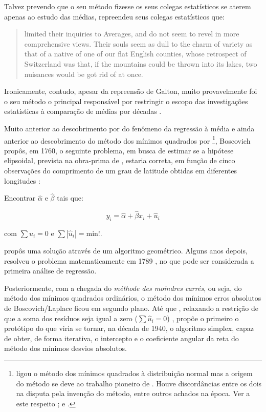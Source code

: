 \documentclass[a4paper, 12pt]{article}
\let\rmarkdownfootnote\footnote%
\def\footnote{\protect\rmarkdownfootnote}
\begin{document}
Talvez prevendo que o seu método fizesse os seus colegas estatísticos se
aterem apenas ao estudo das médias, \textcite[p.~62]{galton}
\autocite[\emph{apud}][p.~350]{koenker2000} repreendeu seus colegas
estatísticos que:

\begin{quote}
limited their inquiries to Averages, and do not seem to revel in more
comprehensive views. Their souls seem as dull to the charm of variety as
that of a native of one of our flat English counties, whose retrospect
of Switzerland was that, if the mountains could be thrown into its
lakes, two nuisances would be got rid of at once.
\end{quote}

Ironicamente, contudo, apesar da repreensão de Galton, muito
provavelmente foi o seu método o principal responsável por restringir o
escopo das investigações estatísticas à comparação de médias por décadas
\autocite[350]{koenker2000}.

Muito anterior ao descobrimento por \textcite{galton} do fenômeno da
regressão à média e ainda anterior ao descobrimento do método dos
mínimos quadrados por \textcite{legendre1805} \footnote{\textcite{gauss1809}
  ligou o método dos mínimos quadrados à distribuição normal mas a
  origem do método se deve ao trabalho pioneiro de
  \textcite{legendre1805}. Houve discordâncias entre os dois na disputa
  pela invenção do método, entre outros achados na época. Ver a este
  respeito \textcite{STIGLER197731}; \textcite{stigler1981} e
  \textcite{stigler1986}.}, Boscovich propôs, em 1760, o seguinte
problema, em busca de estimar se a hipótese elipsoidal, prevista na
obra-prima de \textcite{newton}, estaria correta, em função de cinco
observações do comprimento de um grau de latitude obtidas em diferentes
longitudes
\autocites[p.~353]{koenker2000}[p.~281]{tortoise}[p.~40]{stigler1986}:

Encontrar \(\hat \alpha\) e \(\hat \beta\) tais que:

\[y_i = \hat \alpha + \hat \beta x_i + \hat u_i\]

com \(\sum \hat u_i = 0\) e \(\sum |\hat u_i| = \text{min!}\).

\textcite{boscovich} propôs uma solução através de um algoritmo
geométrico. Alguns anos depois, \textcite{laplace1789} resolveu o
problema matematicamente em 1789 \autocite[281]{tortoise}, no que pode
ser considerada a primeira análise de regressão.

Posteriormente, com a chegada do \emph{méthode des moindres carrés}, ou
seja, do método dos mínimos quadrados ordinários, o método dos mínimos
erros absolutos de Boscovich/Laplace ficou em segundo plano. Até que
\textcite{edgeworth}, relaxando a restrição de que a soma dos resíduos
seja igual a zero (\(\sum \hat u_i = 0\)) \autocite[281]{tortoise},
propõe o primeiro o protótipo do que viria se tornar, na década de 1940,
o algoritmo simplex, capaz de obter, de forma iterativa, o intercepto e
o coeficiente angular da reta do método dos mínimos desvios absolutos.
\end{document}
